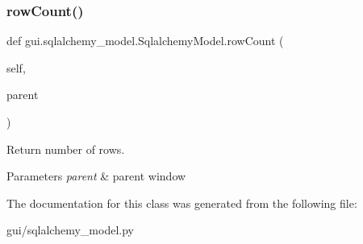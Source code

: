 \subsubsection{\texorpdfstring{row\+Count()}{rowCount()}}
{\footnotesize\ttfamily def gui.\+sqlalchemy\+\_\+model.\+Sqlalchemy\+Model.\+row\+Count (\begin{DoxyParamCaption}\item[{}]{self,  }\item[{}]{parent }\end{DoxyParamCaption})}



Return number of rows. 


\begin{DoxyParams}{Parameters}
{\em parent} & parent window \\
\hline
\end{DoxyParams}


The documentation for this class was generated from the following file\+:\begin{DoxyCompactItemize}
\item 
gui/sqlalchemy\+\_\+model.\+py\end{DoxyCompactItemize}
